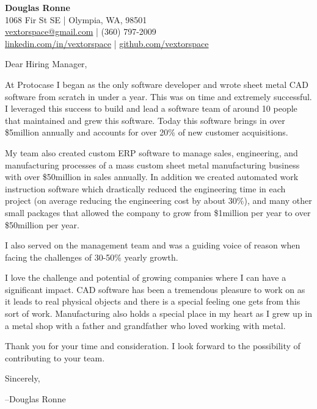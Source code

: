 \documentclass[letter,12pt]{article}
\begin{document}
\begin{center}
    {\Huge \textbf{Douglas Ronne}}\\
    \vspace{2mm}
    1068 Fir St SE | Olympia, WA, 98501\\
    \href{mailto:vextorspace@gmail.com}{vextorspace@gmail.com} | (360) 797-2009\\
    \href{www.linkedin.com/in/douglas-ronne-7133272a}{linkedin.com/in/vextorspace} | \href{https://github.com/vextorspace}{github.com/vextorspace}
\end{center}

Dear Hiring Manager,

\vspace{.5cm}
\noindent
At Protocase I began as the only software developer and wrote sheet metal CAD software from scratch in under a year. This was on time and extremely successful. I leveraged this success to build and lead a software team of around 10 people that maintained and grew this software. Today this software brings in over \$5million annually and accounts for over 20\% of new customer acquisitions.

\vspace{.5cm}
\noindent
My team also created custom ERP software to manage sales, engineering, and manufacturing processes of a  mass custom sheet metal manufacturing business with over \$50million in sales annually. In addition we created automated work instruction software which drastically reduced the engineering time in each project (on average reducing the engineering cost by about 30\%), and many other small packages that allowed the company to grow from \$1million per year to over \$50million per year.

\vspace{.5cm}
\noindent
I also served on the management team and was a guiding voice of reason when facing the challenges of 30-50\% yearly growth.

\vspace{.5cm}
\noindent
I love the challenge and potential of growing companies where I can have a significant impact. CAD software has been a tremendous pleasure to work on as it leads to real physical objects and there is a special feeling one gets from this sort of work. Manufacturing also holds a special place in my heart as I grew up in a metal shop with a father and grandfather who loved working with metal.

\vspace{.5cm}
\noindent
Thank you for your time and consideration. I look forward to the possibility of contributing to your team.

\vspace{1cm}
\noindent
Sincerely,

\noindent
--Douglas Ronne
\end{document}
